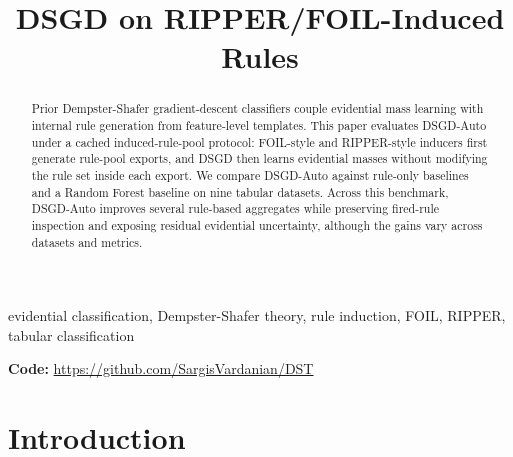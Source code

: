 \documentclass[conference]{IEEEtran}
\begin{document}
\title{DSGD on RIPPER/FOIL-Induced Rules}

\author{
\and
{}
\and
{}
}

\maketitle

\begin{abstract}
Prior Dempster-Shafer gradient-descent classifiers couple evidential mass learning with internal rule generation from feature-level templates. This paper evaluates DSGD-Auto under a cached induced-rule-pool protocol: FOIL-style and RIPPER-style inducers first generate rule-pool exports, and DSGD then learns evidential masses without modifying the rule set inside each export. We compare DSGD-Auto against rule-only baselines and a Random Forest baseline on nine tabular datasets. Across this benchmark, DSGD-Auto improves several rule-based aggregates while preserving fired-rule inspection and exposing residual evidential uncertainty, although the gains vary across datasets and metrics.
\end{abstract}

\begin{IEEEkeywords}
evidential classification, Dempster-Shafer theory, rule induction, FOIL, RIPPER, tabular classification
\end{IEEEkeywords}

\noindent\textbf{Code:} \url{https://github.com/SargisVardanian/DST}

\section{Introduction}
\end{document}
